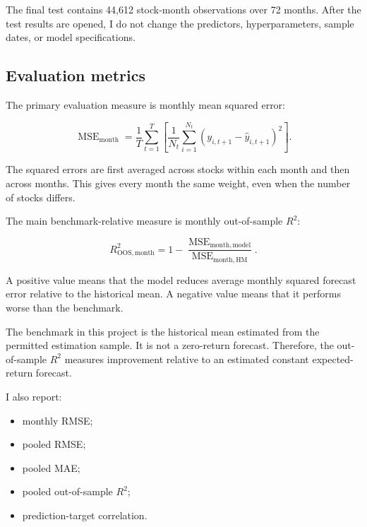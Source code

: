 \documentclass[11pt,a4paper]{article}
\begin{document}
The final test contains 44,612 stock-month observations over 72 months. After
the test results are opened, I do not change the predictors, hyperparameters,
sample dates, or model specifications.

\subsection{Evaluation metrics}

The primary evaluation measure is monthly mean squared error:

\begin{equation}
 \operatorname{MSE}_{\mathrm{month}}
 =
 \frac{1}{T}
 \sum_{t=1}^{T}
 \left[
 \frac{1}{N_t}
 \sum_{i=1}^{N_t}
 \left(
 y_{i,t+1}
 -
 \widehat{y}_{i,t+1}
 \right)^2
 \right].
 \label{eq:monthly-mse}
\end{equation}

The squared errors are first averaged across stocks within each month and then
across months. This gives every month the same weight, even when the number of
stocks differs.

The main benchmark-relative measure is monthly out-of-sample \(R^2\):

\begin{equation}
 R^2_{\mathrm{OOS,month}}
 =
 1
 -
 \frac{
   \operatorname{MSE}_{\mathrm{month,model}}
 }{
   \operatorname{MSE}_{\mathrm{month,HM}}
 }.
 \label{eq:monthly-oos-r2}
\end{equation}

A positive value means that the model reduces average monthly squared forecast
error relative to the historical mean. A negative value means that it performs
worse than the benchmark.

The benchmark in this project is the historical mean estimated from the
permitted estimation sample. It is not a zero-return forecast. Therefore, the
out-of-sample \(R^2\) measures improvement relative to an estimated constant
expected-return forecast.

I also report:

\begin{itemize}
  \item monthly RMSE;
  \item pooled RMSE;
  \item pooled MAE;
  \item pooled out-of-sample \(R^2\);
  \item prediction-target correlation.
\end{itemize}
\end{document}
